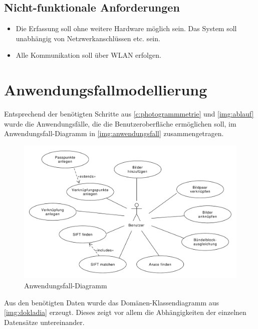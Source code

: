 \documentclass[a4paper,12pt,bibliography=totoc, listof=totoc,titlepage]{scrreprt}
\begin{document}
\subsection{Nicht-funktionale Anforderungen}
\begin{itemize}
    \item Die Erfassung soll ohne weitere Hardware möglich sein. Das System soll unabhängig von Netzwerkanschlüssen etc. sein.
    \item Alle Kommunikation soll über WLAN erfolgen.
\end{itemize}

\section{Anwendungsfallmodellierung}
\label{sec:Anwendungsfallmodellierung}

Entsprechend der benötigten Schritte aus \autoref{c:photogrammmetrie} und \autoref{img:ablauf} wurde die Anwendungsfälle, die die Benutzeroberfläche ermöglichen soll, im Anwendungsfall-Dia\-gramm in \autoref{img:anwendungsfall} zusammengetragen.

\begin{figure}[!htbp]
    \centering
    \includegraphics[width=1\textwidth]{./img/UseCase.pdf}
    \centering
    \caption{Anwendungsfall-Diagramm} %
    \label{img:anwendungsfall} %
\end{figure}

Aus den benötigten Daten wurde das Domänen-Klassendiagramm aus \autoref{img:dokladia} erzeugt. Dieses zeigt vor allem die Abhängigkeiten der einzelnen Datensätze untereinander.
\end{document}
